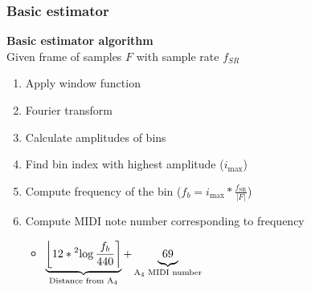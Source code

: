 \documentclass[table]{beamer}
\newcommand*\struttert[1]{\vrule width0pt height0pt depth#1\relax}
\newcommand{\round}[1]{\left \lfloor #1 \right \rceil}
\newcommand{\notee}[2]{#1${}_{#2}$}
\begin{document}
\begin{frame}
\frametitle{Basic estimator}
    {\large \textbf{Basic estimator algorithm}}\\
    Given frame of samples $F$ with sample rate $f_{SR}$
    \begin{enumerate}
        \item Apply window function
        \item Fourier transform
        \item Calculate amplitudes of bins
        \item Find bin index with highest amplitude ($i_{\text{max}}$)
        \item Compute frequency of the bin ($f_b = i_{\text{max}} * \frac{f_{\text{SR}}}{|F|}$)
        \item Compute MIDI note number corresponding to frequency\\
        \begin{itemize}
            \item[{\LARGE \rotatebox[origin=c]{180}{$\Lsh$}}] $\underbrace{\struttert{0.75mm}\round{12 * {}^{2}\!\log{\frac{f_b}{440}}}}_{\text{Distance from \notee{A}{4}}} + \underbrace{\struttert{0.75mm}69}_{\text{\notee{A}{4} MIDI number}}$
        \end{itemize}
    \end{enumerate}
\end{frame}
\end{document}
